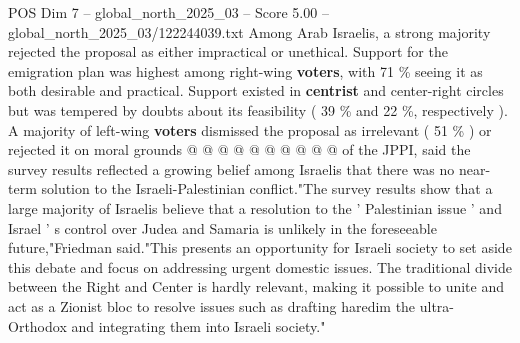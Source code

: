 \begin{textsample}{POS Dim 7 – global\_north\_2025\_03 – Score 5.00 – global\_north\_2025\_03/122244039.txt}
Among Arab Israelis, a strong majority rejected the proposal as either impractical or unethical.
Support for the emigration plan was highest among right-wing \textbf{voters}, with 71 \% seeing it as both desirable and practical.
Support existed in \textbf{centrist} and center-right circles but was tempered by doubts about its feasibility ( 39 \% and 22 \%, respectively ).
A majority of left-wing \textbf{voters} dismissed the proposal as irrelevant ( 51 \% ) or rejected it on moral grounds @ @ @ @ @ @ @ @ @ @ of the JPPI, said the survey results reflected a growing belief among Israelis that there was no near-term solution to the Israeli-Palestinian conflict."The survey results show that a large majority of Israelis believe that a resolution to the ' Palestinian issue ' and Israel ' s control over Judea and Samaria is unlikely in the foreseeable future,"Friedman said."This presents an opportunity for Israeli society to set aside this debate and focus on addressing urgent domestic issues.
The traditional divide between the Right and Center is hardly relevant, making it possible to unite and act as a Zionist bloc to resolve issues such as drafting haredim the ultra-Orthodox and integrating them into Israeli society."

\end{textsample}
